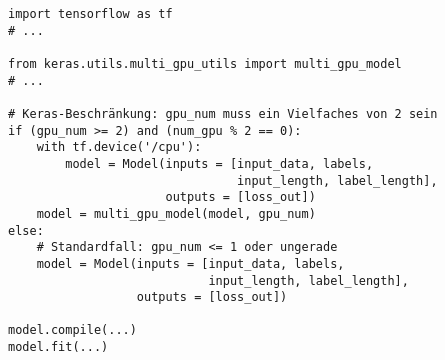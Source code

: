 \begin{code}
\begin{verbatim}
import tensorflow as tf
# ...

from keras.utils.multi_gpu_utils import multi_gpu_model
# ...

# Keras-Beschränkung: gpu_num muss ein Vielfaches von 2 sein
if (gpu_num >= 2) and (num_gpu % 2 == 0):
    with tf.device('/cpu'):
        model = Model(inputs = [input_data, labels,
                                input_length, label_length],
                      outputs = [loss_out])
    model = multi_gpu_model(model, gpu_num)
else:
    # Standardfall: gpu_num <= 1 oder ungerade
    model = Model(inputs = [input_data, labels,
                            input_length, label_length],
                  outputs = [loss_out])

model.compile(...)
model.fit(...)
\end{verbatim}
\label{daten:taurus:multigpu:source}
\end{code}
